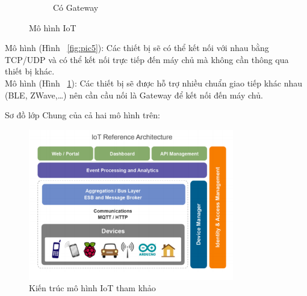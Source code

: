 \begin{figure}[H]
\begin{subfigure}[b]{0.5\textwidth}
  	 \caption[Có Gateway]{Có Gateway}
    \label{fig:pic6}
  \end{subfigure}
  \caption{Mô hình IoT}\label{fig:mohinhiot}
\end{figure}

Mô hình (Hình ~\ref{fig:pic5}): Các thiết bị sẽ có thể kết nối với nhau bằng TCP/UDP và có thể kết nối trực tiếp đến máy chủ mà không cần thông qua thiết bị khác.\\
Mô hình (Hình ~\ref{fig:pic6}): Các thiết bị sẽ được hỗ trợ nhiều chuẩn giao tiếp khác nhau (BLE, ZWave,…) nên cần cầu nối là Gateway để kết nối đến máy chủ. 


\newpage

Sơ đồ lớp Chung của cả hai mô hình trên:
\begin{figure}[H] 
\centering    
\includegraphics[width=0.8\textwidth]{pic7}
\caption[Kiến trúc mô hình IoT tham khảo]{Kiến trúc mô hình IoT tham khảo}
\label{fig:pic7}
\end{figure}

